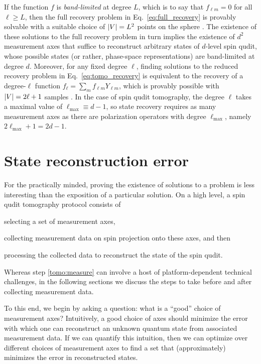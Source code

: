 \documentclass[nofootinbib,twocolumn]{revtex4-1}
\renewcommand{\t}{\text} %
\begin{document}
If the function $f$ is {\it band-limited} at degree $L$, which is to say that $f_{\ell m}=0$ for all $\ell\ge L$, then the full recovery problem in Eq.~\eqref{eq:full_recovery} is provably solvable with a suitable choice of $\abs{V}=L^2$ points on the sphere \cite{freeden2008spherical, freeden2018spherical}.
The existence of these solutions to the full recovery problem in turn implies the existence of $d^2$ measurement axes that suffice to reconstruct arbitrary states of $d$-level spin qudit, whose possible states (or rather, phase-space representations) are band-limited at degree $d$.
Moreover, for any fixed degree $\ell$, finding solutions to the reduced recovery problem in Eq.~\eqref{eq:tomo_recovery} is equivalent to the recovery of a degree-$\ell$ function $f_\ell = \sum_m f_{\ell m} Y_{\ell m}$, which is provably possible with $\abs{V}=2\ell+1$ samples \cite{freeden2008spherical}.
In the case of spin qudit tomography, the degree $\ell$ takes a maximal value of $\ell_{\t{max}}\equiv d-1$, so state recovery requires as many measurement axes as there are polarization operators with degree $\ell_{\t{max}}$, namely $2\ell_{\t{max}}+1=2d-1$.

\section{State reconstruction error}
\label{sec:error}

For the practically minded, proving the existence of solutions to a problem is less interesting than the exposition of a particular solution.
On a high level, a spin qudit tomography protocol consists of
\begin{enumerate*}
\item selecting a set of measurement axes,
\item \label{tomo:measure} collecting measurement data on spin projection onto these axes, and then
\item processing the collected data to reconstruct the state of the spin qudit.
\end{enumerate*}
Whereas step \ref{tomo:measure} can involve a host of platform-dependent technical challenges, in the following sections we discuss the steps to take before and after collecting measurement data.

To this end, we begin by asking a question: what is a ``good'' choice of measurement axes?
Intuitively, a good choice of axes should minimize the error with which one can reconstruct an unknown quantum state from associated measurement data.
If we can quantify this intuition, then we can optimize over different choices of measurement axes to find a set that (approximately) minimizes the error in reconstructed states.
\end{document}
